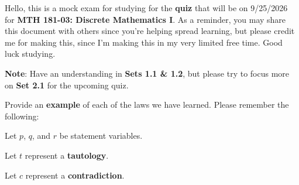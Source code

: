 \documentclass[letterpaper]{exam}
\begin{document}

    \noindent Hello, this is a mock exam for studying for the \textbf{quiz} that will be on 9/25/2026 for \textbf{MTH 181-03: Discrete Mathematics I}. As a reminder, you may share this document with others since you're helping spread learning, but please credit me for making this, since I'm making this in my very limited free time. Good luck studying.
    
    \textbf{Note}: Have an understanding in \textbf{Sets 1.1 \& 1.2}, but please try to focus more on \textbf{Set 2.1} for the upcoming quiz.
    
    
    \begin{questions}
        
        \question Provide an \textbf{example} of each of the laws we have learned. Please remember the following:

        Let $p$, $q$, and $r$ be statement variables.

        Let $t$ represent a \textbf{tautology}.

        Let $c$ represent a \textbf{contradiction}.

\end{questions}
\end{document}
